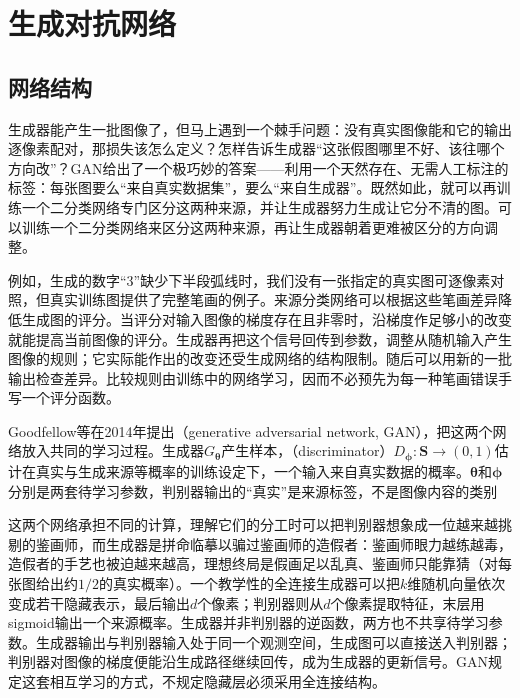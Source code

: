 \section{生成对抗网络}
\label{sec:neural-generative-gan}

\subsection{网络结构}
\label{sec:neural-generative-gan-structure}

生成器能产生一批图像了，但马上遇到一个棘手问题：没有真实图像能和它的输出逐像素配对，那损失该怎么定义？怎样告诉生成器“这张假图哪里不好、该往哪个方向改”？GAN给出了一个极巧妙的答案——利用一个天然存在、无需人工标注的标签：每张图要么“来自真实数据集”，要么“来自生成器”。既然如此，就可以再训练一个二分类网络专门区分这两种来源，并让生成器努力生成让它分不清的图。可以训练一个二分类网络来区分这两种来源，再让生成器朝着更难被区分的方向调整。

例如，生成的数字“3”缺少下半段弧线时，我们没有一张指定的真实图可逐像素对照，但真实训练图提供了完整笔画的例子。来源分类网络可以根据这些笔画差异降低生成图的评分。当评分对输入图像的梯度存在且非零时，沿梯度作足够小的改变就能提高当前图像的评分。生成器再把这个信号回传到参数，调整从随机输入产生图像的规则；它实际能作出的改变还受生成网络的结构限制。随后可以用新的一批输出检查差异。比较规则由训练中的网络学习，因而不必预先为每一种笔画错误手写一个评分函数。

Goodfellow等在2014年提出（generative adversarial network, GAN），把这两个网络放入共同的学习过程。生成器$G_{\bm{\theta}}$产生样本，（discriminator）$D_{\bm{\phi}}:\bm{S}\to(0,1)$估计在真实与生成来源等概率的训练设定下，一个输入来自真实数据的概率。$\bm{\theta}$和$\bm{\phi}$分别是两套待学习参数，判别器输出的“真实”是来源标签，不是图像内容的类别

这两个网络承担不同的计算，理解它们的分工时可以把判别器想象成一位越来越挑剔的鉴画师，而生成器是拼命临摹以骗过鉴画师的造假者：鉴画师眼力越练越毒，造假者的手艺也被迫越来越高，理想终局是假画足以乱真、鉴画师只能靠猜（对每张图给出约$1/2$的真实概率）。一个教学性的全连接生成器可以把$k$维随机向量依次变成若干隐藏表示，最后输出$d$个像素；判别器则从$d$个像素提取特征，末层用sigmoid输出一个来源概率。生成器并非判别器的逆函数，两方也不共享待学习参数。生成器输出与判别器输入处于同一个观测空间，生成图可以直接送入判别器；判别器对图像的梯度便能沿生成路径继续回传，成为生成器的更新信号。GAN规定这套相互学习的方式，不规定隐藏层必须采用全连接结构。

